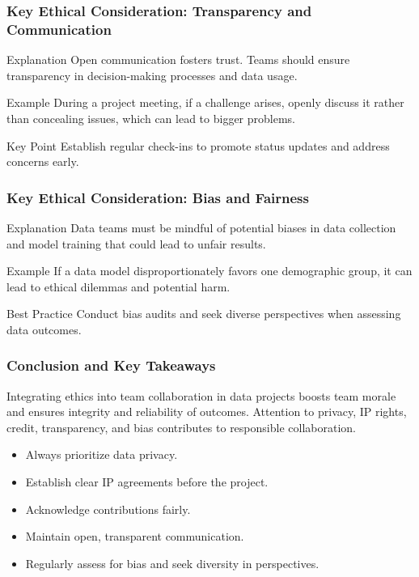 \documentclass[aspectratio=169]{beamer}
\begin{document}
\begin{frame}[fragile]
    \frametitle{Key Ethical Consideration: Transparency and Communication}
    \begin{block}{Explanation}
        Open communication fosters trust. Teams should ensure transparency in decision-making processes and data usage.
    \end{block}
    \begin{exampleblock}{Example}
        During a project meeting, if a challenge arises, openly discuss it rather than concealing issues, which can lead to bigger problems.
    \end{exampleblock}
    \begin{block}{Key Point}
        Establish regular check-ins to promote status updates and address concerns early.
    \end{block}
\end{frame}

\begin{frame}[fragile]
    \frametitle{Key Ethical Consideration: Bias and Fairness}
    \begin{block}{Explanation}
        Data teams must be mindful of potential biases in data collection and model training that could lead to unfair results.
    \end{block}
    \begin{exampleblock}{Example}
        If a data model disproportionately favors one demographic group, it can lead to ethical dilemmas and potential harm.
    \end{exampleblock}
    \begin{block}{Best Practice}
        Conduct bias audits and seek diverse perspectives when assessing data outcomes.
    \end{block}
\end{frame}

\begin{frame}[fragile]
    \frametitle{Conclusion and Key Takeaways}
    Integrating ethics into team collaboration in data projects boosts team morale and ensures integrity and reliability of outcomes. Attention to privacy, IP rights, credit, transparency, and bias contributes to responsible collaboration.
    
    \begin{itemize}
        \item Always prioritize data privacy.
        \item Establish clear IP agreements before the project.
        \item Acknowledge contributions fairly.
        \item Maintain open, transparent communication.
        \item Regularly assess for bias and seek diversity in perspectives.
    \end{itemize}
\end{frame}
\end{document}
